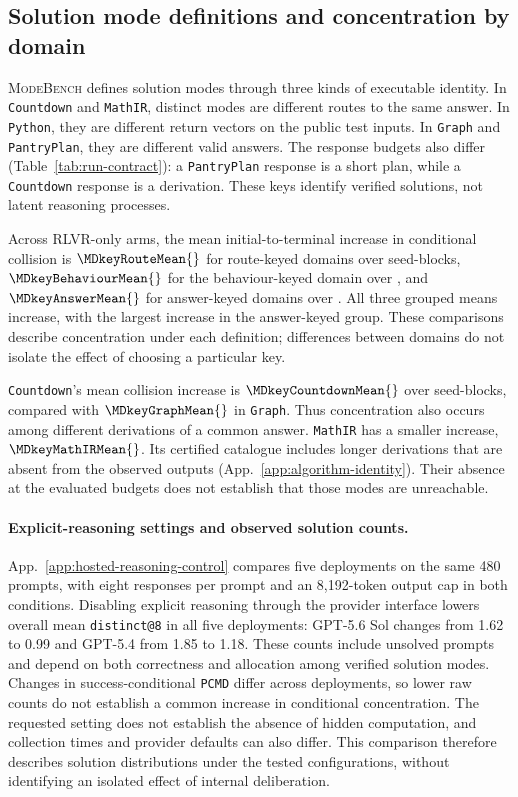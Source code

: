 \documentclass{article}
\newcommand{\1}{\mathbf 1}
\newcommand{\mb}{\textsc{ModeBench}}
\newcommand{\pmd}{\texttt{PCMD}}
\theoremstyle{remark}
\theoremstyle{definition}
\theoremstyle{plain}
\begin{document}
\subsection{Solution mode definitions and concentration by domain}
\label{app:mode-keying}

\mb{} defines solution modes through three kinds of executable identity.
In \texttt{Countdown} and \texttt{MathIR}, distinct modes are different routes to the same
answer. In \texttt{Python}, they are different return vectors on the public test
inputs. In \texttt{Graph} and \texttt{PantryPlan}, they are different valid answers. The
response budgets also differ (Table~\ref{tab:run-contract}): a \texttt{PantryPlan}
response is a short plan, while a \texttt{Countdown} response is a derivation.
These keys identify verified solutions, not latent reasoning processes.

Across RLVR-only arms, the mean initial-to-terminal increase in conditional
collision is $\MDkeyRouteMean{}$ for route-keyed domains over
\MDkeyRouteN{} seed-blocks, $\MDkeyBehaviourMean{}$ for the behaviour-keyed
domain over \MDkeyBehaviourN{}, and $\MDkeyAnswerMean{}$ for answer-keyed
domains over \MDkeyAnswerN{}. All three grouped means increase, with the
largest increase in the answer-keyed group. These comparisons describe
concentration under each definition; differences between domains do not
isolate the effect of choosing a particular key.

\texttt{Countdown}'s mean collision increase is $\MDkeyCountdownMean{}$ over
\MDkeyCountdownN{} seed-blocks, compared with $\MDkeyGraphMean{}$ in \texttt{Graph}.
Thus concentration also occurs among different derivations of a common
answer. \texttt{MathIR} has a smaller increase, $\MDkeyMathIRMean{}$. Its certified
catalogue includes longer derivations that are absent from the observed
outputs (App.~\ref{app:algorithm-identity}). Their absence at the evaluated
budgets does not establish that those modes are unreachable.

\paragraph{Explicit-reasoning settings and observed solution counts.}
App.~\ref{app:hosted-reasoning-control} compares five deployments on the
same 480 prompts, with eight responses per prompt and an 8,192-token output
cap in both conditions. Disabling explicit reasoning through the provider
interface lowers overall mean \texttt{distinct@8} in all five deployments:
GPT-5.6 Sol changes from 1.62 to 0.99 and GPT-5.4 from 1.85 to 1.18.
These counts include unsolved prompts and depend on both correctness and
allocation among verified solution modes. Changes in success-conditional
\pmd{} differ across deployments, so lower raw counts do not establish a
common increase in conditional concentration. The requested setting does
not establish the absence of hidden computation, and collection times and
provider defaults can also differ. This comparison therefore describes
solution distributions under the tested configurations, without identifying
an isolated effect of internal deliberation.
\end{document}
